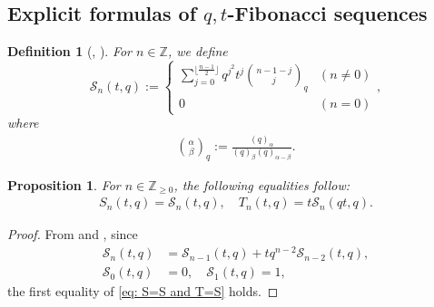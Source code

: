 \documentclass[a4paper]{article}
\newcommand{\Zz}{\mathbb{Z}}
\numberwithin{equation}{section}
\theoremstyle{plain}
\newtheorem{defi}{Definition}
\newtheorem{prop}{Proposition}
\begin{document}
\begin{appendices}
\section{Explicit formulas of $q,t$-Fibonacci sequences}
\label{app: B}
\begin{defi}[\cite{A}, \cite{C}]
For $n\in\Zz$, we define
$$
\mathcal{S}_{n}(t,q)
   :=
   \begin{cases}
   \sum_{j = 0}^{\lfloor \frac{n - 1}{2}\rfloor}
      q^{j^{2}}t^{j}\binom{n - 1 - j}{j}_{q} & (n \not= 0) \\
   0 & (n = 0)
   \end{cases}, 
$$
where
\begin{align*}
\binom{\alpha}{\beta}_q:=\frac{(q)_\alpha}{(q)_\beta(q)_{\alpha-\beta}}. 
\end{align*}
\end{defi}

\begin{prop}
\label{prop: q-Fibonacci}
For $n\in\Zz_{\geq0}$, the following equalities follow:  
\begin{align}
\label{eq: S=S and T=S}
S_n(t,q)=\mathcal{S}_{n}(t,q),\quad T_n(t,q)= t\mathcal{S}_{n}(qt,q). 
\end{align}
\end{prop}
\begin{proof}
From \cite{A} and \cite{C}, since 
\begin{align}
\label{eq: mathS recursion}
\mathcal{S}_n(t,q)&=\mathcal{S}_{n-1}(t,q)+t q^{n-2}\mathcal{S}_{n-2}(t,q), \\
\mathcal{S}_0(t,q)&=0,\quad \mathcal{S}_1(t,q)=1, 
\end{align}
the first equality of \eqref{eq: S=S and T=S} holds. 


\end{proof}
\end{appendices}
\end{document}
